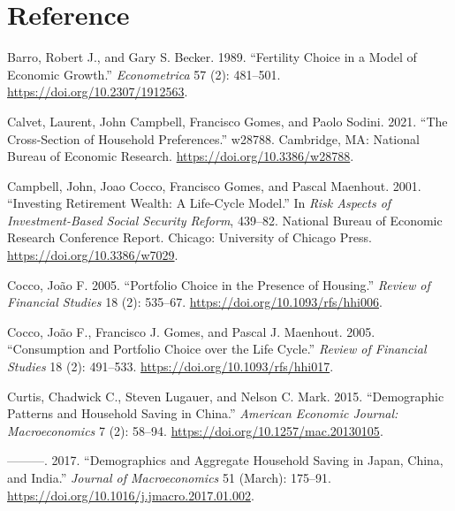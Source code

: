\documentclass[
  12pt,
]{article}
\newlength{\cslhangindent}
\newlength{\cslentryspacingunit} %
\newenvironment{CSLReferences}[2] %
 {%
  \setlength{\parindent}{0pt}
  \ifodd #1
  \let\oldpar\par
  \def\par{\hangindent=\cslhangindent\oldpar}
  \fi
  \setlength{\parskip}{#2\cslentryspacingunit}
 }%
 {}
\begin{document}
\hypertarget{reference}{%
\section*{Reference}\label{reference}}

\hypertarget{refs}{}
\begin{CSLReferences}{1}{0}
\leavevmode{}%
Barro, Robert J., and Gary S. Becker. 1989. {``Fertility Choice in a
Model of Economic Growth.''} \emph{Econometrica} 57 (2): 481--501.
\url{https://doi.org/10.2307/1912563}.

\leavevmode{}%
Calvet, Laurent, John Campbell, Francisco Gomes, and Paolo Sodini. 2021.
{``The Cross-Section of Household Preferences.''} w28788. Cambridge,
{MA}: National Bureau of Economic Research.
\url{https://doi.org/10.3386/w28788}.

\leavevmode{}%
Campbell, John, Joao Cocco, Francisco Gomes, and Pascal Maenhout. 2001.
{``Investing Retirement Wealth: A Life-Cycle Model.''} In \emph{Risk
Aspects of Investment-Based Social Security Reform}, 439--82. National
Bureau of Economic Research Conference Report. Chicago: University of
Chicago Press. \url{https://doi.org/10.3386/w7029}.

\leavevmode{}%
Cocco, João F. 2005. {``Portfolio Choice in the Presence of Housing.''}
\emph{Review of Financial Studies} 18 (2): 535--67.
\url{https://doi.org/10.1093/rfs/hhi006}.

\leavevmode{}%
Cocco, João F., Francisco J. Gomes, and Pascal J. Maenhout. 2005.
{``Consumption and Portfolio Choice over the Life Cycle.''} \emph{Review
of Financial Studies} 18 (2): 491--533.
\url{https://doi.org/10.1093/rfs/hhi017}.

\leavevmode{}%
Curtis, Chadwick C., Steven Lugauer, and Nelson C. Mark. 2015.
{``Demographic Patterns and Household Saving in China.''} \emph{American
Economic Journal: Macroeconomics} 7 (2): 58--94.
\url{https://doi.org/10.1257/mac.20130105}.

\leavevmode{}%
---------. 2017. {``Demographics and Aggregate Household Saving in
Japan, China, and India.''} \emph{Journal of Macroeconomics} 51 (March):
175--91. \url{https://doi.org/10.1016/j.jmacro.2017.01.002}.


\end{CSLReferences}
\end{document}
